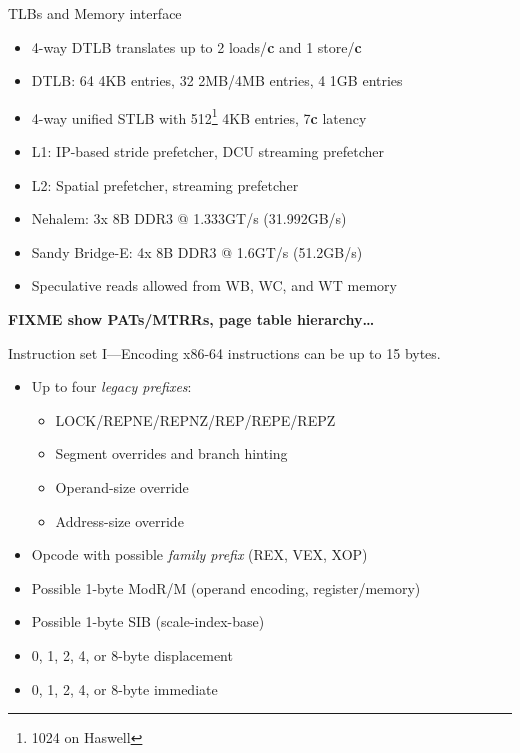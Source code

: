 \documentclass[mathserif,xcolor={dvipsnames,table}]{beamer}
\begin{document}
\begin{frame}{TLBs and Memory interface}
\begin{itemize}
\item 4-way DTLB translates up to 2 loads/\textbf{c} and 1 store/\textbf{c}
\item DTLB: 64 4KB entries, 32 2MB/4MB entries, 4 1GB entries
\item 4-way unified STLB with 512\footnote{1024 on Haswell} 4KB entries, 7\textbf{c} latency
\item L1: IP-based stride prefetcher, DCU streaming prefetcher
\item L2: Spatial prefetcher, streaming prefetcher
\item Nehalem: 3x 8B DDR3 @ 1.333GT/s (31.992GB/s)
\item Sandy Bridge-E: 4x 8B DDR3 @ 1.6GT/s (51.2GB/s)
\item Speculative reads allowed from WB, WC, and WT memory
\end{itemize}
\textbf{FIXME show PATs/MTRRs, page table hierarchy\ldots}
\end{frame}

\begin{frame}{Instruction set I---Encoding}
x86-64 instructions can be up to 15 bytes.
\vspace{.5in}
\begin{itemize}
\item Up to four \textit{legacy prefixes}:
\begin{itemize}
\item{LOCK/REPNE/REPNZ/REP/REPE/REPZ}
\item{Segment overrides and branch hinting}
\item{Operand-size override}
\item{Address-size override}
\end{itemize}
\item Opcode with possible \textit{family prefix} (REX, VEX, XOP)
\item Possible 1-byte ModR/M (operand encoding, register/memory)
\item Possible 1-byte SIB (scale-index-base)
\item 0, 1, 2, 4, or 8-byte displacement
\item 0, 1, 2, 4, or 8-byte immediate
\end{itemize}
\end{frame}
\end{document}
